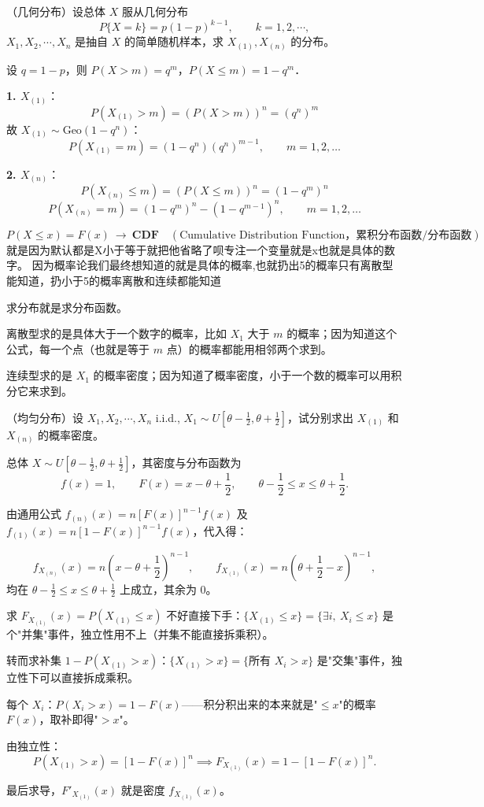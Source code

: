 \begin{homework}[2]
（几何分布）设总体 $X$ 服从几何分布
\[
P\{X=k\}=p(1-p)^{k-1},\qquad k=1,2,\cdots,
\]
$X_1,X_2,\cdots,X_n$ 是抽自 $X$ 的简单随机样本，求 $X_{(1)},X_{(n)}$ 的分布。
\end{homework}
\begin{solution}
设 $q=1-p$，则 $P(X>m)=q^m$，$P(X\le m)=1-q^m$．

\textbf{1. $X_{(1)}$}：
$$P(X_{(1)}>m)=\left(P(X>m)\right)^n=(q^n)^m$$
故 $X_{(1)}\sim\text{Geo}(1-q^n)$：
$$P(X_{(1)}=m)=(1-q^n)(q^n)^{m-1},\qquad m=1,2,\dots$$

\textbf{2. $X_{(n)}$}：
$$P(X_{(n)}\le m)=\left(P(X\le m)\right)^n=(1-q^m)^n$$
$$P(X_{(n)}=m)=(1-q^m)^n-(1-q^{m-1})^n,\qquad m=1,2,\dots$$
\end{solution}
\begin{dxtips}[F里面是具体的数字因为我们默认是小于等于]
\[
P(X\le x)=F(x)\ \longrightarrow\ \textbf{CDF}\quad(\text{Cumulative Distribution Function，累积分布函数/分布函数})
\]就是因为默认都是X小于等于就把他省略了呗专注一个变量就是x也就是具体的数字。
因为概率论我们最终想知道的就是具体的概率,也就扔出5的概率只有离散型能知道，扔小于5的概率离散和连续都能知道   
\end{dxtips}
\begin{dxtips}
求分布就是求分布函数。

离散型求的是具体大于一个数字的概率，比如 $X_1$ 大于 $m$ 的概率；因为知道这个公式，每一个点（也就是等于 $m$ 点）的概率都能用相邻两个求到。

连续型求的是 $X_1$ 的概率密度；因为知道了概率密度，小于一个数的概率可以用积分它来求到。
\end{dxtips}
\begin{homework}[3]
（均匀分布）设 $X_1,X_2,\cdots,X_n$ i.i.d., $X_1\sim U\!\left[\theta-\frac12,\theta+\frac12\right]$，试分别求出 $X_{(1)}$ 和 $X_{(n)}$ 的概率密度。
\end{homework}
\begin{solution}
总体 $X\sim U\!\left[\theta-\frac12,\theta+\frac12\right]$，其密度与分布函数为
\[
f(x)=1,\qquad F(x)=x-\theta+\frac12,\qquad \theta-\frac12\le x\le\theta+\frac12.
\]

由通用公式 $f_{(n)}(x)=n[F(x)]^{n-1}f(x)$ 及 $f_{(1)}(x)=n[1-F(x)]^{n-1}f(x)$，代入得：

\[
f_{X_{(n)}}(x)=n\left(x-\theta+\frac12\right)^{n-1},\qquad
f_{X_{(1)}}(x)=n\left(\theta+\frac12-x\right)^{n-1},
\]
均在 $\theta-\frac12\le x\le\theta+\frac12$ 上成立，其余为 $0$。
\end{solution}
\begin{dxtips}
求 $F_{X_{(1)}}(x)=P(X_{(1)}\le x)$ 不好直接下手：$\{X_{(1)}\le x\}=\{\exists i,\ X_i\le x\}$ 是个"并集"事件，独立性用不上（并集不能直接拆乘积）。

转而求补集 $1-P(X_{(1)}>x)$：$\{X_{(1)}>x\}=\{\text{所有 }X_i>x\}$ 是"交集"事件，独立性下可以直接拆成乘积。

每个 $X_i$：$P(X_i>x)=1-F(x)$——积分积出来的本来就是"$\le x$"的概率 $F(x)$，取补即得"$>x$"。

由独立性：
$$P(X_{(1)}>x)=[1-F(x)]^n
\implies
F_{X_{(1)}}(x)=1-[1-F(x)]^n.$$

最后求导，$F'_{X_{(1)}}(x)$ 就是密度 $f_{X_{(1)}}(x)$。
\end{dxtips}
